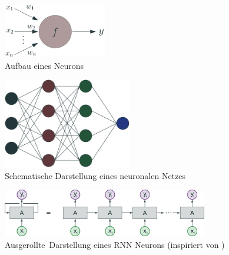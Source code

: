     	\begin{figure}[ht]
    		\centering
    		\includegraphics[width=0.4\textwidth]{images/Neron}
    		\caption{Aufbau eines Neurons}
    		\label{fig:Neuron}
    	\end{figure}
	    \begin{figure}[ht]
	    	\centering
	    	\includegraphics[width=0.5\textwidth]{images/NeuralNet}
	    	\caption{Schematische Darstellung eines neuronalen Netzes}
	    	\label{fig:NeuralNet}
	    \end{figure}
    
    	\begin{figure}[ht]
    		\centering
    		\includegraphics[width=0.8\textwidth]{images/Illustrationen/RNN}
    		\caption{\glqq Ausgerollte\grqq \ Darstellung eines RNN Neurons (inspiriert von \cite{OLAH2015})}
    		\label{fig:RNN}
    	\end{figure}
	    
